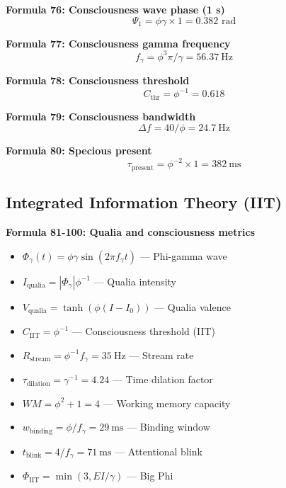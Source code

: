 \documentclass[12pt,a4paper]{article}
\begin{document}
\textbf{Formula 76: Consciousness wave phase (1 s)}
\begin{equation}
\Psi_1 = \phi \gamma \times 1 = 0.382 \text{ rad}
\end{equation}

\textbf{Formula 77: Consciousness gamma frequency}
\begin{equation}
f_\gamma = \phi^3 \pi / \gamma = \SI{56.37}{\hertz}
\end{equation}

\textbf{Formula 78: Consciousness threshold}
\begin{equation}
C_{\text{thr}} = \phi^{-1} = 0.618
\end{equation}

\textbf{Formula 79: Consciousness bandwidth}
\begin{equation}
\Delta f = 40/\phi = \SI{24.7}{\hertz}
\end{equation}

\textbf{Formula 80: Specious present}
\begin{equation}
\tau_{\text{present}} = \phi^{-2} \times 1 = \SI{382}{\ms}
\end{equation}

\subsection{Integrated Information Theory (IIT)}

\textbf{Formula 81-100: Qualia and consciousness metrics}
\begin{itemize}
    \item $\Phi_\gamma(t) = \phi \gamma \sin(2\pi f_\gamma t)$ — Phi-gamma wave
    \item $I_{\text{qualia}} = |\Phi_\gamma| \phi^{-1}$ — Qualia intensity
    \item $V_{\text{qualia}} = \tanh(\phi(I-I_0))$ — Qualia valence
    \item $C_{\text{IIT}} = \phi^{-1}$ — Consciousness threshold (IIT)
    \item $R_{\text{stream}} = \phi^{-1} f_\gamma = \SI{35}{\hertz}$ — Stream rate
    \item $\tau_{\text{dilation}} = \gamma^{-1} = 4.24$ — Time dilation factor
    \item $WM = \phi^2 + 1 = 4$ — Working memory capacity
    \item $w_{\text{binding}} = \phi/f_\gamma = \SI{29}{\ms}$ — Binding window
    \item $t_{\text{blink}} = 4/f_\gamma = \SI{71}{\ms}$ — Attentional blink
    \item $\Phi_{\text{IIT}} = \min(3, EI/\gamma)$ — Big Phi
\end{itemize}
\end{document}
